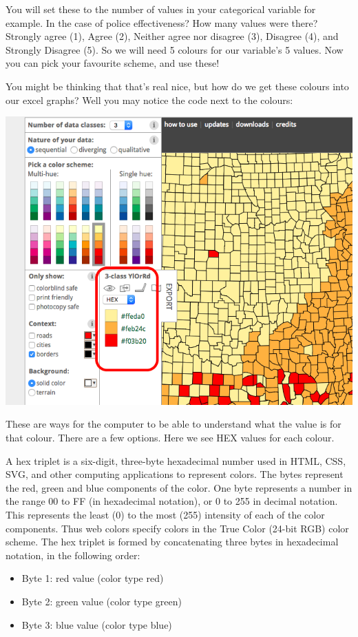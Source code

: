 \documentclass[
]{book}
\providecommand{\tightlist}{%
  \setlength{\itemsep}{0pt}\setlength{\parskip}{0pt}}
\begin{document}
You will set these to the number of values in your categorical variable for example. In the case of police effectiveness? How many values were there? Strongly agree (1), Agree (2), Neither agree nor disagree (3), Disagree (4), and Strongly Disagree (5). So we will need 5 colours for our variable's 5 values. Now you can pick your favourite scheme, and use these!

You might be thinking that that's real nice, but how do we get these colours into our excel graphs? Well you may notice the code next to the colours:

\includegraphics{imgs/how_to_copy_cols.png}

These are ways for the computer to be able to understand what the value is for that colour. There are a few options. Here we see HEX values for each colour.

A hex triplet is a six-digit, three-byte hexadecimal number used in HTML, CSS, SVG, and other computing applications to represent colors. The bytes represent the red, green and blue components of the color. One byte represents a number in the range 00 to FF (in hexadecimal notation), or 0 to 255 in decimal notation. This represents the least (0) to the most (255) intensity of each of the color components. Thus web colors specify colors in the True Color (24-bit RGB) color scheme. The hex triplet is formed by concatenating three bytes in hexadecimal notation, in the following order:

\begin{itemize}
\tightlist
\item
  Byte 1: red value (color type red)
\item
  Byte 2: green value (color type green)
\item
  Byte 3: blue value (color type blue)
\end{itemize}
\end{document}
